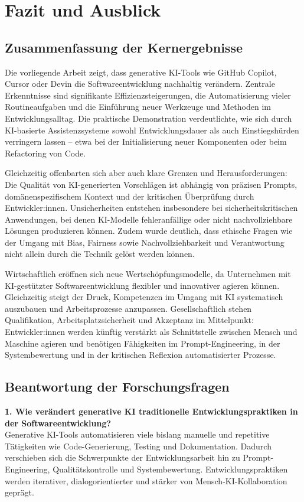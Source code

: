 \chapter{Fazit und Ausblick}

\section{Zusammenfassung der Kernergebnisse}
Die vorliegende Arbeit zeigt, dass generative KI-Tools wie GitHub Copilot,
Cursor oder Devin die Softwareentwicklung nachhaltig verändern. Zentrale
Erkenntnisse sind signifikante Effizienzsteigerungen, die Automatisierung
vieler Routineaufgaben und die Einführung neuer Werkzeuge und Methoden im
Entwicklungsalltag. Die praktische Demonstration verdeutlichte, wie sich durch
KI-basierte Assistenzsysteme sowohl Entwicklungsdauer als auch Einstiegshürden
verringern lassen – etwa bei der Initialisierung neuer Komponenten oder beim
Refactoring von Code.

Gleichzeitig offenbarten sich aber auch klare Grenzen und Herausforderungen:
Die Qualität von KI-generierten Vorschlägen ist abhängig von präzisen Prompts,
domänenspezifischem Kontext und der kritischen Überprüfung durch
Entwickler:innen. Unsicherheiten entstehen insbesondere bei
sicherheitskritischen Anwendungen, bei denen KI-Modelle fehleranfällige oder
nicht nachvollziehbare Lösungen produzieren können. Zudem wurde deutlich, dass
ethische Fragen wie der Umgang mit Bias, Fairness sowie Nachvollziehbarkeit und
Verantwortung nicht allein durch die Technik gelöst werden können.

Wirtschaftlich eröffnen sich neue Wertschöpfungsmodelle, da Unternehmen mit
KI-gestützter Softwareentwicklung flexibler und innovativer agieren können.
Gleichzeitig steigt der Druck, Kompetenzen im Umgang mit KI systematisch
auszubauen und Arbeitsprozesse anzupassen. Gesellschaftlich stehen
Qualifikation, Arbeitsplatzsicherheit und Akzeptanz im Mittelpunkt:
Entwickler:innen werden künftig verstärkt als Schnittstelle zwischen Mensch und
Maschine agieren und benötigen Fähigkeiten im Prompt-Engineering, in der
Systembewertung und in der kritischen Reflexion automatisierter Prozesse.

\section{Beantwortung der Forschungsfragen}
\textbf{1. Wie verändert generative KI traditionelle Entwicklungspraktiken in der Softwareentwicklung?}\\
Generative KI-Tools automatisieren viele bislang manuelle und repetitive Tätigkeiten wie Code-Generierung, Testing und Dokumentation. Dadurch verschieben sich die Schwerpunkte der Entwicklungsarbeit hin zu Prompt-Engineering, Qualitätskontrolle und Systembewertung. Entwicklungspraktiken werden iterativer, dialogorientierter und stärker von Mensch-KI-Kollaboration geprägt.

